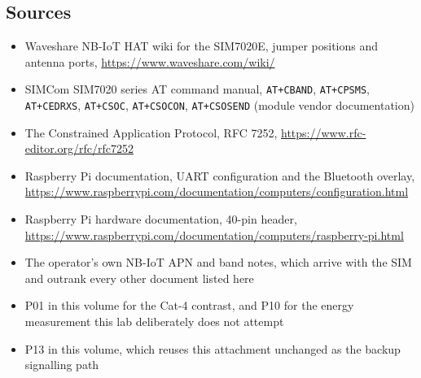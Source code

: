 \subsection*{Sources}

\begin{itemize}
\item Waveshare NB-IoT HAT wiki for the SIM7020E, jumper positions and antenna ports, \url{https://www.waveshare.com/wiki/}
\item SIMCom SIM7020 series AT command manual, \texttt{AT+CBAND}, \texttt{AT+CPSMS}, \texttt{AT+CEDRXS}, \texttt{AT+CSOC}, \texttt{AT+CSOCON}, \texttt{AT+CSOSEND} (module vendor documentation)
\item The Constrained Application Protocol, RFC 7252, \url{https://www.rfc-editor.org/rfc/rfc7252}
\item Raspberry Pi documentation, UART configuration and the Bluetooth overlay, \url{https://www.raspberrypi.com/documentation/computers/configuration.html}
\item Raspberry Pi hardware documentation, 40-pin header, \url{https://www.raspberrypi.com/documentation/computers/raspberry-pi.html}
\item The operator's own NB-IoT APN and band notes, which arrive with the SIM and outrank every other document listed here
\item P01 in this volume for the Cat-4 contrast, and P10 for the energy measurement this lab deliberately does not attempt
\item P13 in this volume, which reuses this attachment unchanged as the backup signalling path
\end{itemize}
